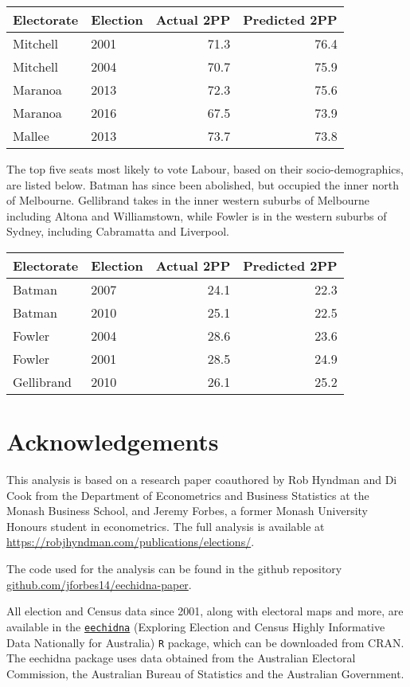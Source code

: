 \documentclass[11pt,a4paper,]{article}
\begin{document}
\begin{tabular}{llrr}
\toprule
Electorate & Election & Actual 2PP & Predicted 2PP\\
\midrule
Mitchell & 2001 & 71.3 & 76.4\\
Mitchell & 2004 & 70.7 & 75.9\\
Maranoa & 2013 & 72.3 & 75.6\\
Maranoa & 2016 & 67.5 & 73.9\\
Mallee & 2013 & 73.7 & 73.8\\
\bottomrule
\end{tabular}

The top five seats most likely to vote Labour, based on their socio-demographics, are listed below. Batman has since been abolished, but occupied the inner north of Melbourne. Gellibrand takes in the inner western suburbs of Melbourne including Altona and Williamstown, while Fowler is in the western suburbs of Sydney, including Cabramatta and Liverpool.

\begin{tabular}{llrr}
\toprule
Electorate & Election & Actual 2PP & Predicted 2PP\\
\midrule
Batman & 2007 & 24.1 & 22.3\\
Batman & 2010 & 25.1 & 22.5\\
Fowler & 2004 & 28.6 & 23.6\\
Fowler & 2001 & 28.5 & 24.9\\
Gellibrand & 2010 & 26.1 & 25.2\\
\bottomrule
\end{tabular}

\hypertarget{acknowledgements}{%
\section{Acknowledgements}\label{acknowledgements}}

This analysis is based on a research paper coauthored by Rob Hyndman and Di Cook from the Department of Econometrics and Business Statistics at the Monash Business School, and Jeremy Forbes, a former Monash University Honours student in econometrics. The full analysis is available at \url{https://robjhyndman.com/publications/elections/}.

The code used for the analysis can be found in the github repository \href{https://github.com/jforbes14/eechidna-paper}{github.com/jforbes14/eechidna-paper}.

All election and Census data since 2001, along with electoral maps and more, are available in the \href{https://cran.r-project.org/package=eechidna}{\texttt{eechidna}} (Exploring Election and Census Highly Informative Data Nationally for Australia) \texttt{R} package, which can be downloaded from CRAN. The eechidna package uses data obtained from the Australian Electoral Commission, the Australian Bureau of Statistics and the Australian Government.

\printbibliography
\end{document}

